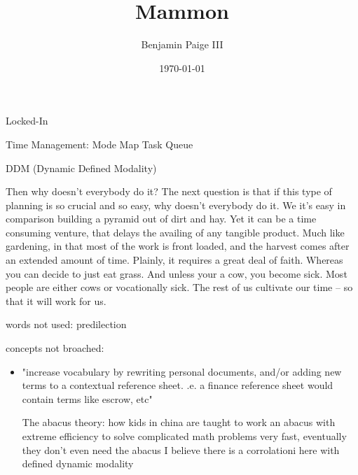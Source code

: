 \title{\bf Mammon}
\author{Benjamin Paige III}
\date{\today}



Locked-In

Time Management:
Mode Map
Task Queue

DDM (Dynamic Defined Modality)

Then why doesn't everybody do it?
	The next question is that if this type of planning is so crucial and so easy, why doesn't everybody do it.  We it's easy in comparison building a pyramid out of dirt and hay.
	Yet it can be a time consuming venture, that delays the availing of any tangible product. Much like gardening, in that most of the work is front loaded, and the harvest comes
	after an extended amount of time.  Plainly, it requires a great deal of faith.  Whereas you can decide to just eat grass.  And unless your a cow, you become sick.  
	Most people are either cows or vocationally sick.  The rest of us cultivate our time -- so that it will work for us.


words not used:
predilection


concepts not broached:

\begin{itemize}
\item
"increase vocabulary by rewriting personal documents, and/or adding new terms to a contextual reference sheet.
.e. a finance reference sheet would contain terms like escrow, etc"

The abacus theory: how kids in china are taught to work an abacus with extreme efficiency
to solve complicated math problems very fast, eventually they don't even need the abacus
I believe there is a corrolationi here with defined dynamic modality
\end{itemize}

